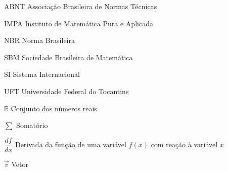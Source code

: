 \listoffigures*
\vspace{-1.35cm}
\listofquadros*
\cleardoublepage


\listoftables*
\cleardoublepage


\begin{siglas}
	\item[ABNT] Associação Brasileira de Normas Técnicas
	\item[IMPA] Instituto de Matemática Pura e Aplicada
	\item[NBR] Norma Brasileira
	\item[SBM] Sociedade Brasileira de Matemática
	\item[SI] Sistema Internacional
	\item[UFT] Universidade Federal do Tocantins
\end{siglas}


\begin{simbolos}
  \item[$ \mathbb{R} $] Conjunto dos números reais
  \item[$ \sum $] Somatório
  \item[$ \dfrac{df}{dx} $] Derivada da função de uma variável $f(x)$ com reação à variável $x$
  \item[$ \overrightarrow{v} $] Vetor
\end{simbolos}


\tableofcontents*
\cleardoublepage
